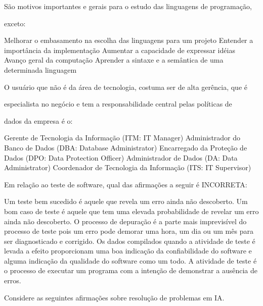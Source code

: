 \documentclass[12pt, addpoints]{exam}
\begin{document}
\begin{questions}
\question

São motivos importantes e gerais para o estudo das linguagens de programação,

exceto:
\begin{choices}
\choice Melhorar o embasamento na escolha das linguagens para um projeto
\choice Entender a importância da implementação
\choice Aumentar a capacidade de expressar idéias
\choice Avanço geral da computação
\choice Aprender a sintaxe e a semântica de uma determinada linguagem
\end{choices}

\question

O usuário que não é da área de tecnologia, costuma ser de alta gerência, que é

especialista no negócio e tem a responsabilidade central pelas políticas de

dados da empresa é o:
\begin{choices}
\choice Gerente de Tecnologia da Informação (ITM: IT Manager)
\choice Administrador do Banco de Dados (DBA: Database Administrator)
\choice Encarregado da Proteção de Dados (DPO: Data Protection Officer)
\choice Administrador de Dados (DA: Data Administrator)
\choice Coordenador de Tecnologia da Informação (ITS: IT Supervisor)
\end{choices}

\question

Em relação ao teste de software, qual das afirmações a seguir é INCORRETA: 
\begin{choices}
\choice Um teste bem sucedido é aquele que revela um erro ainda não descoberto. 
\choice Um bom caso de teste é aquele que tem uma elevada probabilidade de revelar um erro ainda não descoberto. 
\choice O processo de depuração é a parte mais imprevisível do processo de teste pois um erro pode demorar uma hora, um dia ou um mês para ser diagnosticado e corrigido. 
\choice Os dados compilados quando a atividade de teste é levada a efeito proporcionam uma boa indicação da confiabilidade do software e alguma indicação da qualidade do software como um todo. 
\choice A atividade de teste é o processo de executar um programa com a intenção de demonstrar a ausência de erros. 
\end{choices}

\question

Considere as seguintes afirmações sobre resolução de problemas em IA.

\begin{enumerate}[label=\Roman*.]


\end{enumerate}
\end{questions}
\end{document}
